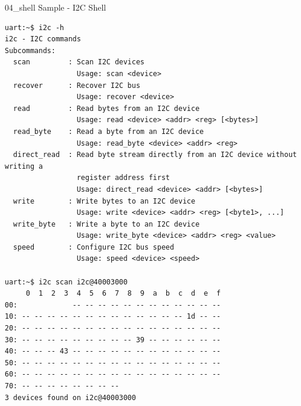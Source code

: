 \documentclass[10pt, aspectratio=169]{beamer}
\begin{document}
\begin{frame}[fragile]{04\_shell Sample - I2C Shell}
  \begin{listing}[H]
    \begin{verbatim}
uart:~$ i2c -h
i2c - I2C commands
Subcommands:
  scan         : Scan I2C devices
                 Usage: scan <device>
  recover      : Recover I2C bus
                 Usage: recover <device>
  read         : Read bytes from an I2C device
                 Usage: read <device> <addr> <reg> [<bytes>]
  read_byte    : Read a byte from an I2C device
                 Usage: read_byte <device> <addr> <reg>
  direct_read  : Read byte stream directly from an I2C device without writing a
                 register address first
                 Usage: direct_read <device> <addr> [<bytes>]
  write        : Write bytes to an I2C device
                 Usage: write <device> <addr> <reg> [<byte1>, ...]
  write_byte   : Write a byte to an I2C device
                 Usage: write_byte <device> <addr> <reg> <value>
  speed        : Configure I2C bus speed
                 Usage: speed <device> <speed>

uart:~$ i2c scan i2c@40003000
     0  1  2  3  4  5  6  7  8  9  a  b  c  d  e  f
00:             -- -- -- -- -- -- -- -- -- -- -- -- 
10: -- -- -- -- -- -- -- -- -- -- -- -- -- 1d -- -- 
20: -- -- -- -- -- -- -- -- -- -- -- -- -- -- -- -- 
30: -- -- -- -- -- -- -- -- -- 39 -- -- -- -- -- -- 
40: -- -- -- 43 -- -- -- -- -- -- -- -- -- -- -- -- 
50: -- -- -- -- -- -- -- -- -- -- -- -- -- -- -- -- 
60: -- -- -- -- -- -- -- -- -- -- -- -- -- -- -- -- 
70: -- -- -- -- -- -- -- --                         
3 devices found on i2c@40003000
    \end{verbatim}
  \end{listing}
\end{frame}
\end{document}
